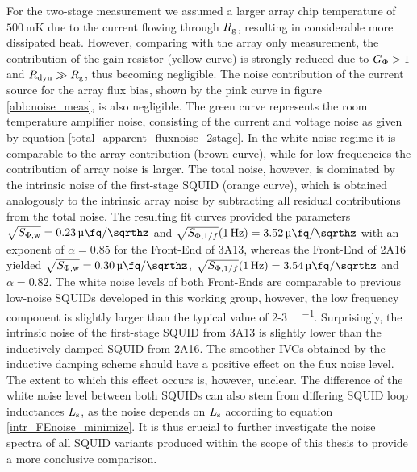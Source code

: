 For the two-stage measurement we assumed a larger array chip temperature of $\qty{500}{\milli\kelvin}$ due to the current flowing through $R_{\rm g}$, resulting in considerable more dissipated heat. However, comparing with the array only measurement, the contribution of the gain resistor (yellow curve) is strongly reduced due to $G_{\rm \Phi}>1$ and $R_{\rm dyn}\gg R_{\rm g}$, thus becoming negligible. The noise contribution of the current source for the array flux bias, shown by the pink curve in figure \ref{abb:noise_meas}, is also negligible. The green curve represents the room temperature amplifier noise, consisting of the current and voltage noise as given by equation \ref{total_apparent_fluxnoise_2stage}. In the white noise regime it is comparable to the array contribution (brown curve), while for low frequencies the contribution of array noise is larger. The total noise, however, is dominated by the intrinsic noise of the first-stage SQUID (orange curve), which is obtained analogously to the intrinsic array noise by subtracting all residual contributions from the total noise. The resulting fit curves provided the parameters $\sqrt{S_{\rm \Phi,w}}=\qty{0.23}{\micro\fq\per\sqrthz}$ and $\sqrt{S_{{\rm \Phi},1/f}}(\qty{1}{\Hz})=\qty{3.52}{\micro\fq\per\sqrthz}$ with an exponent of $\alpha=0.85$ for the Front-End of 3A13, whereas the Front-End of 2A16 yielded $\sqrt{S_{\rm \Phi,w}}=\qty{0.30}{\micro\fq\per\sqrthz}$, $\sqrt{S_{{\rm \Phi},1/f}}(\qty{1}{\Hz})=\qty{3.54}{\micro\fq\per\sqrthz}$ and $\alpha=0.82$. The white noise levels of both Front-Ends are comparable to previous low-noise SQUIDs developed in this working group, however, the low frequency component is slightly larger than the typical value of 2-3 \unit{\micro\fq\per\sqrthz}. Surprisingly, the intrinsic noise of the first-stage SQUID from 3A13 is slightly lower than the inductively damped SQUID from 2A16. The smoother IVCs obtained by the inductive damping scheme should have a positive effect on the flux noise level. The extent to which this effect occurs is, however, unclear. The difference of the white noise level between both SQUIDs can also stem from differing SQUID loop inductances $L_{\rm s}$, as the noise depends on $L_{\rm s}$ according to equation \ref{intr_FEnoise_minimize}. It is thus crucial to further investigate the noise spectra of all SQUID variants produced within the scope of this thesis to provide a more conclusive comparison. \\

